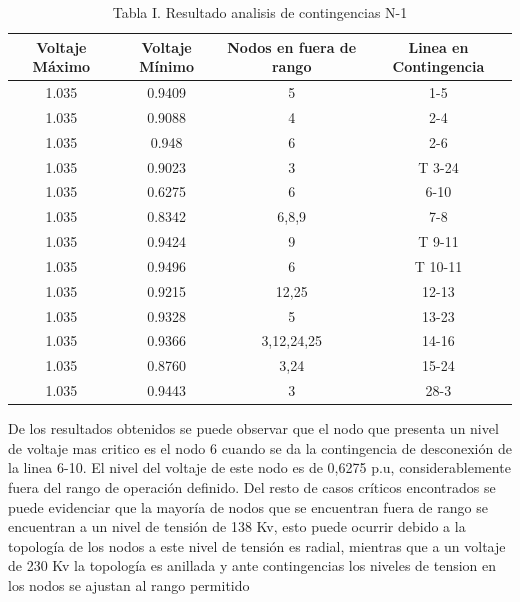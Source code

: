 \documentclass{article}
\begin{document}
\begin{table}[H]
\caption*{Tabla I. Resultado analisis de contingencias N-1}
\label{Tabla:Resultado analisis de contingencias N-1}
\centering
\begin{tabular}{|c|c|c|c|}
\hline
Voltaje Máximo & Voltaje Mínimo & Nodos en fuera de rango & Linea en Contingencia \\ \hline
1.035          & 0.9409         & 5                       & 1-5                   \\ \hline
1.035          & 0.9088         & 4                       & 2-4                   \\ \hline
1.035          & 0.948          & 6                       & 2-6                   \\ \hline
1.035          & 0.9023         & 3                       & T 3-24                  \\ \hline
1.035          & 0.6275         & 6                       & 6-10                  \\ \hline
1.035          & 0.8342         & 6,8,9                   & 7-8                   \\ \hline
1.035          & 0.9424         & 9                       & T 9-11                  \\ \hline
1.035          & 0.9496         & 6                       & T 10-11                 \\ \hline
1.035          & 0.9215         & 12,25                   & 12-13                 \\ \hline
1.035          & 0.9328         & 5                       & 13-23                 \\ \hline
1.035          & 0.9366         & 3,12,24,25              & 14-16                 \\ \hline
1.035          & 0.8760         & 3,24                    & 15-24                 \\ \hline
1.035          & 0.9443         & 3                       & 28-3                  \\ \hline
\end{tabular}
\end{table}

De los resultados obtenidos se puede observar que el nodo que presenta un nivel de voltaje mas critico es el nodo 6 cuando se da la contingencia de desconexión de la linea 6-10. El nivel del voltaje de este nodo es de 0,6275 p.u, considerablemente fuera del rango de operación definido. Del resto de casos críticos encontrados se puede evidenciar que la mayoría de nodos que se encuentran fuera de rango se encuentran a un nivel de tensión de 138 Kv, esto puede ocurrir debido a la topología de los nodos a este nivel de tensión es radial, mientras que a un voltaje de 230 Kv la topología es anillada y ante contingencias los niveles de tension en los nodos se ajustan al rango permitido
\end{document}

